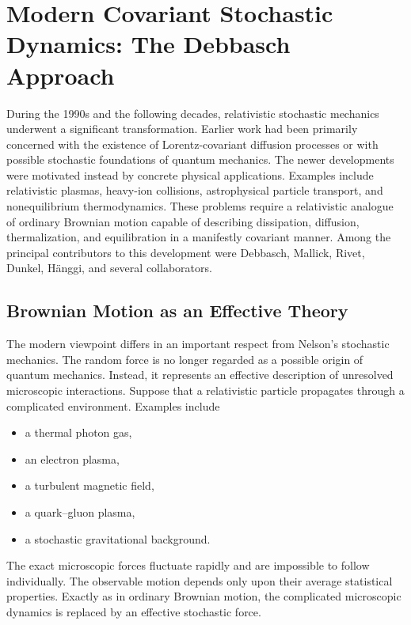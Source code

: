 \section{Modern Covariant Stochastic Dynamics:
The Debbasch Approach}
\label{sec:Debbasch}
During the 1990s and the following decades, relativistic stochastic
mechanics underwent a significant transformation. Earlier work had been
primarily concerned with the existence of Lorentz-covariant diffusion
processes or with possible stochastic foundations of quantum mechanics.
The newer developments were motivated instead by concrete physical
applications.
Examples include relativistic plasmas, heavy-ion collisions,
astrophysical particle transport, and nonequilibrium thermodynamics.
These problems require a relativistic analogue of ordinary Brownian
motion capable of describing dissipation, diffusion, thermalization,
and equilibration in a manifestly covariant manner.
Among the principal contributors to this development were Debbasch,
Mallick, Rivet, Dunkel, Hänggi, and several collaborators.
\subsection{Brownian Motion as an Effective Theory}
The modern viewpoint differs in an important respect from Nelson's
stochastic mechanics.
The random force is no longer regarded as a possible origin of quantum
mechanics.
Instead, it represents an effective description of unresolved
microscopic interactions.
Suppose that a relativistic particle propagates through a complicated
environment.
Examples include
\begin{itemize}
\item a thermal photon gas,
\item an electron plasma,
\item a turbulent magnetic field,
\item a quark--gluon plasma,
\item a stochastic gravitational background.
\end{itemize}
The exact microscopic forces fluctuate rapidly and are impossible to
follow individually.
The observable motion depends only upon their average statistical
properties.
Exactly as in ordinary Brownian motion, the complicated microscopic
dynamics is replaced by an effective stochastic force.
